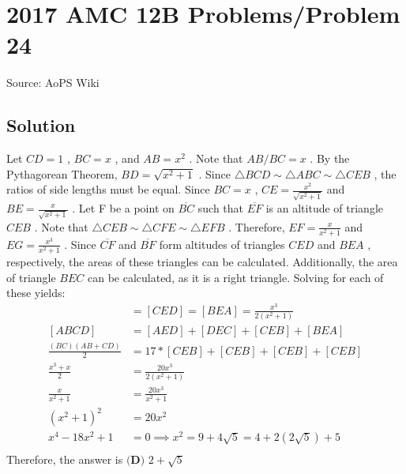 \documentclass[12pt]{article}
\begin{document}
\section*{{2017 AMC 12B Problems/Problem 24}}
Source: AoPS Wiki

\subsection*{Solution}
Let $CD=1$ , $BC=x$ , and $AB=x^2$ . Note that $AB/BC=x$ . By the Pythagorean Theorem, $BD=\sqrt{x^2+1}$ . Since $\triangle BCD \sim \triangle ABC \sim \triangle CEB$ , the ratios of side lengths must be equal. Since $BC=x$ , $CE=\frac{x^2}{\sqrt{x^2+1}}$ and $BE=\frac{x}{\sqrt{x^2+1}}$ . Let F be a point on $\overline{BC}$ such that $\overline{EF}$ is an altitude of triangle $CEB$ . Note that $\triangle CEB \sim \triangle CFE \sim \triangle EFB$ . Therefore, $EF=\frac{x}{x^2+1}$ and $EG=\frac{x^3}{x^2+1}$ . Since $\overline{CF}$ and $\overline{BF}$ form altitudes of triangles $CED$ and $BEA$ , respectively, the areas of these triangles can be calculated. Additionally, the area of triangle $BEC$ can be calculated, as it is a right triangle. Solving for each of these yields: \begin{align*}
[BEC] &=[CED]=[BEA]=\frac{x^3}{2(x^2+1)} \\
[ABCD] &=[AED]+[DEC]+[CEB]+[BEA] \\
\frac{(BC)(AB+CD)}{2} &= 17*[CEB]+ [CEB] + [CEB] + [CEB] \\
\frac{x^3+x}{2} &= \frac{20x^3}{2(x^2+1)} \\
\frac{x}{x^2+1} &= \frac{20x^3}{x^2+1} \\
(x^2+1)^2 &=20x^2 \\
x^4-18x^2+1 &=0 \implies x^2=9+4\sqrt{5}=4+2(2\sqrt{5})+5 \\
\end{align*} Therefore, the answer is $\boxed{\textbf{(D) } 2+\sqrt{5}}$
\end{document}
